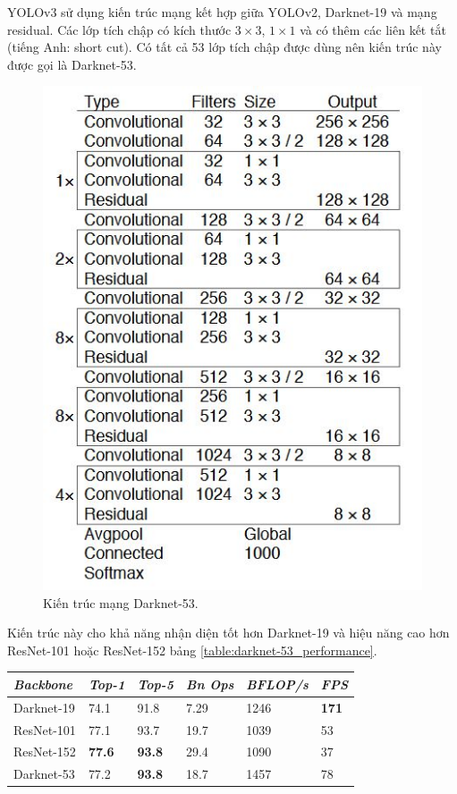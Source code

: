 YOLOv3 sử dụng kiến trúc mạng kết hợp giữa YOLOv2, Darknet-19 và mạng residual. Các lớp tích chập có kích thước $3 \times 3$, $1 \times 1$ và có thêm các liên kết tắt (tiếng Anh: short cut). Có tất cả 53 lớp tích chập được dùng nên kiến trúc này được gọi là Darknet-53.
\begin{figure}[ht!]
	\centerline{\includegraphics[scale=0.8]{images/yolov3_architecture.jpg}}
  	\caption{Kiến trúc mạng Darknet-53.}
  	\label{fig:bounding_box_prediction}
\end{figure}
Kiến trúc này cho khả năng nhận diện tốt hơn Darknet-19 và hiệu năng cao hơn ResNet-101 hoặc ResNet-152 bảng \ref{table:darknet-53_performance}.
\begin{center}

  \begin{tabular} {l l l l l l}
  \toprule
  \it Backbone & \it Top-1 & \it Top-5 & \it Bn Ops & \it BFLOP/s & \it FPS \\
  \midrule

  Darknet-19 & 74.1 & 91.8 & 7.29 & 1246 & \textbf{171} \\
  ResNet-101 & 77.1 & 93.7 & 19.7 & 1039 & 53 \\
  ResNet-152 & \textbf{77.6} & \textbf{93.8} & 29.4 & 1090 & 37 \\
  Darknet-53 & 77.2 & \textbf{93.8} & 18.7 & 1457 & 78 \\
          
  \bottomrule
  \end{tabular}

\end{center}
